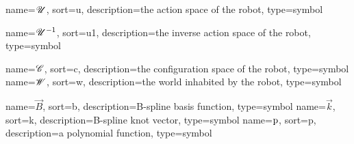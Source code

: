 	{%
		name=\ensuremath{\vecspace{U}},
		sort=u,
		description=the action space of the robot,
		type=symbol
	}
	\newcommand{\actionspace}{\gls{sym:actionspace}}

	{%
		name=\ensuremath{\vecspace{U}^{-1}},
		sort=u1,
		description=the inverse action space of the robot,
		type=symbol
	}
	\newcommand{\invactionspace}{\gls{sym:invactionspace}}

	{%
		name=\ensuremath{\vecspace{C}},
		sort=c,
		description=the configuration space of the robot,
		type=symbol
	}
	\newcommand{\configurationspace}{\gls{sym:configurationspace}}
	{%
		name=\ensuremath{\vecspace{W}},
		sort=w,
		description=the world inhabited by the robot,
		type=symbol
	}
	\newcommand{\world}{\gls{sym:worldspace}}

	{%
		name=\ensuremath{\vec{B}},
		sort=b,
		description=B-spline basis function,
		type=symbol
	}
	\newcommand{\bspline}{\gls{sym:bspline}}
	{%
		name=\ensuremath{\vec{k}},
		sort=k,
		description=B-spline knot vector,
		type=symbol
	}
	\newcommand{\knot}{\gls{sym:knot}}
	{%
		name=\ensuremath{\func{p}},
		sort=p,
		description=a polynomial function,
		type=symbol
	}
	\newcommand{\polynomial}{\gls{sym:polynomial}}

